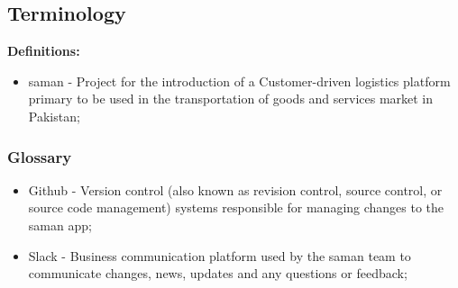 \subsection{Terminology}

\noindent \textbf{Definitions:}
\begin{itemize}
    \item saman - Project for the introduction of a Customer-driven logistics platform primary to be used in the transportation of goods and services market in Pakistan;
\end{itemize}

\subsubsection{Glossary}
\begin{itemize}
    \item Github - Version control (also known as revision control, source control, or source code management) systems responsible for managing changes to the saman app;
    \item Slack - Business communication platform used by the saman team to communicate changes, news, updates and any questions or feedback;
\end{itemize}